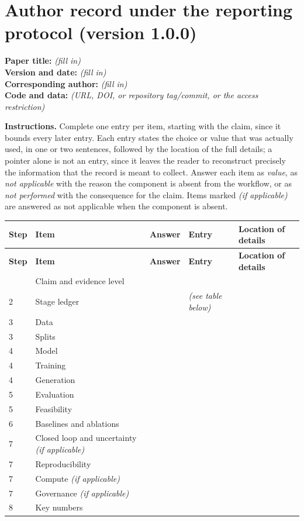 \documentclass[10pt]{article}
\newcommand{\RecordHeader}{%
\toprule
\textbf{Step} & \textbf{Item} & \textbf{Answer} & \textbf{Entry} & \textbf{Location of details}\\
\midrule}
\newcommand{\Blank}{\emph{(fill in)}}
\begin{document}
\section*{Author record under the reporting protocol (version 1.0.0)}

\noindent\textbf{Paper title:} \Blank\\
\textbf{Version and date:} \Blank\\
\textbf{Corresponding author:} \Blank\\
\textbf{Code and data:} \emph{(URL, DOI, or repository tag/commit, or the access restriction)}

\medskip
\noindent\textbf{Instructions.} Complete one entry per item, starting with the claim, since it bounds every later entry. Each entry states the choice or value that was actually used, in one or two sentences, followed by the location of the full details; a pointer alone is not an entry, since it leaves the reader to reconstruct precisely the information that the record is meant to collect. Answer each item as \emph{value}, as \emph{not applicable} with the reason the component is absent from the workflow, or as \emph{not performed} with the consequence for the claim. Items marked \emph{(if applicable)} are answered as not applicable when the component is absent.

\setlength{\LTpre}{4pt}
\setlength{\LTpost}{8pt}

\begin{longtable}{@{}L{0.05\textwidth} L{0.20\textwidth} L{0.12\textwidth} L{0.36\textwidth} L{0.19\textwidth}@{}}
\RecordHeader
\endfirsthead
\RecordHeader
\endhead
\bottomrule
{} & Claim and evidence level & & & \\
2 & Stage ledger & & \emph{(see table below)} & \\
3 & Data & & & \\
3 & Splits & & & \\
4 & Model & & & \\
4 & Training & & & \\
4 & Generation & & & \\
5 & Evaluation & & & \\
5 & Feasibility & & & \\
6 & Baselines and ablations & & & \\
7 & Closed loop and uncertainty \emph{(if applicable)} & & & \\
7 & Reproducibility & & & \\
7 & Compute \emph{(if applicable)} & & & \\
7 & Governance \emph{(if applicable)} & & & \\
8 & Key numbers & & & \\
\end{longtable}
\end{document}
